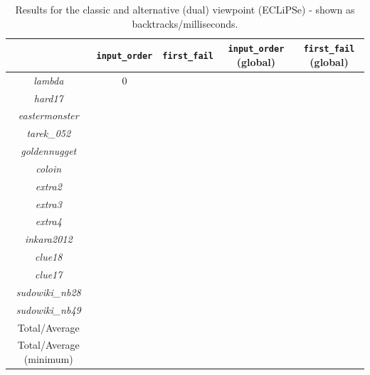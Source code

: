 \begin{table}[H]
\bgroup
\def\arraystretch{1.3}
\begin{tabular}{ccccc}
\multicolumn{1}{l}{}    & \texttt{input\_order} & \texttt{first\_fail} & \texttt{input\_order} (global) & \texttt{first\_fail} (global) \\ \hline
\textit{lambda} & 0 &             &                           &                          \\
\textit{hard17}          &              &             &                           &                          \\
\textit{eastermonster}   &              &             &                           &                          \\
\textit{tarek\_052}      &              &             &                           &                          \\
\textit{goldennugget}    &              &             &                           &                          \\
\textit{coloin}          &              &             &                           &                          \\
\textit{extra2}          &              &             &                           &                          \\
\textit{extra3}          &              &             &                           &                          \\
\textit{extra4}          &              &             &                           &                          \\
\textit{inkara2012}      &              &             &                           &                          \\
\textit{clue18}          &              &             &                           &                          \\
\textit{clue17}          &              &             &                           &                          \\
\textit{sudowiki\_nb28}  &              &             &                           &                          \\
\textit{sudowiki\_nb49}  &              &             &                           &                          \\\hline
Total/Average           &              &             &                           &                          \\
Total/Average (minimum) &              &             &                           &                         
\end{tabular}
\egroup
\caption{Results for the classic and alternative (dual) viewpoint (ECLiPSe) - shown as backtracks/milliseconds.}
\label{tab:res2}
\end{table}

